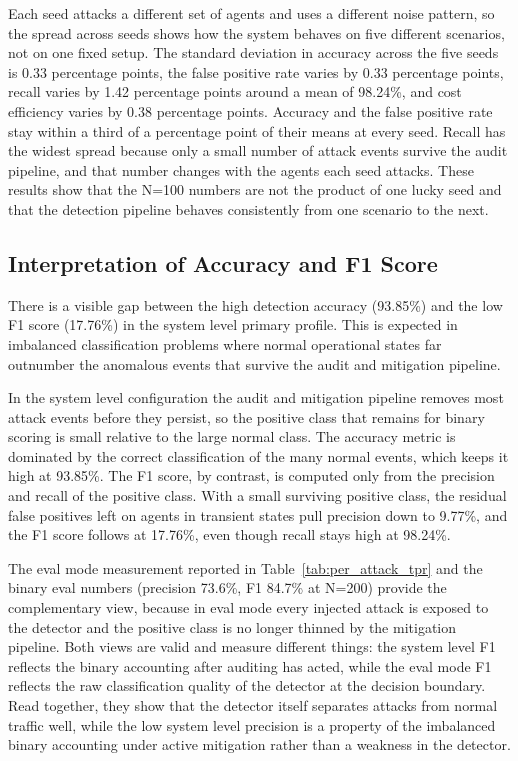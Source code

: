 \noindent
Each seed attacks a different set of agents and uses a different noise pattern, so the spread across seeds shows how the system behaves on five different scenarios, not on one fixed setup. The standard deviation in accuracy across the five seeds is 0.33 percentage points, the false positive rate varies by 0.33 percentage points, recall varies by 1.42 percentage points around a mean of 98.24\%, and cost efficiency varies by 0.38 percentage points. Accuracy and the false positive rate stay within a third of a percentage point of their means at every seed. Recall has the widest spread because only a small number of attack events survive the audit pipeline, and that number changes with the agents each seed attacks. These results show that the N=100 numbers are not the product of one lucky seed and that the detection pipeline behaves consistently from one scenario to the next.

\subsection{Interpretation of Accuracy and F1 Score}
\label{sec:acc_f1_interpretation}

There is a visible gap between the high detection accuracy (93.85\%) and the low F1 score (17.76\%) in the system level primary profile. This is expected in imbalanced classification problems where normal operational states far outnumber the anomalous events that survive the audit and mitigation pipeline.

\par \vspace{0.35cm}

\noindent
In the system level configuration the audit and mitigation pipeline removes most attack events before they persist, so the positive class that remains for binary scoring is small relative to the large normal class. The accuracy metric is dominated by the correct classification of the many normal events, which keeps it high at 93.85\%. The F1 score, by contrast, is computed only from the precision and recall of the positive class. With a small surviving positive class, the residual false positives left on agents in transient states pull precision down to 9.77\%, and the F1 score follows at 17.76\%, even though recall stays high at 98.24\%.

\par \vspace{0.35cm}

\noindent
The eval mode measurement reported in Table~\ref{tab:per_attack_tpr} and the binary eval numbers (precision 73.6\%, F1 84.7\% at N=200) provide the complementary view, because in eval mode every injected attack is exposed to the detector and the positive class is no longer thinned by the mitigation pipeline. Both views are valid and measure different things: the system level F1 reflects the binary accounting after auditing has acted, while the eval mode F1 reflects the raw classification quality of the detector at the decision boundary. Read together, they show that the detector itself separates attacks from normal traffic well, while the low system level precision is a property of the imbalanced binary accounting under active mitigation rather than a weakness in the detector.


